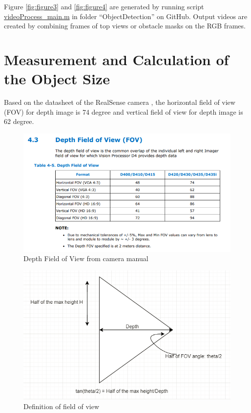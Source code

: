 \documentclass[
  oneside]{ubcthesis}
\begin{document}
Figure \ref{fig:figure3} and \ref{fig:figure4} are generated by running script \href{https://github.com/luckymeng7/EECE597/blob/master/ObjectDetection/videoProcess_main.m}{videoProcess\_main.m} in folder ``ObjectDetection'' on GitHub. Output videos are created by combining frames of top views or obstacle masks on the RGB frames.

\hypertarget{measurement-and-calculation-of-the-object-size}{%
\section{Measurement and Calculation of the Object Size}\label{measurement-and-calculation-of-the-object-size}}

Based on the datasheet of the RealSense camera \citep{realSenseD400}, the horizontal field of view (FOV) for depth image is 74 degree and vertical field of view for depth image is 62 degree.

\begin{figure}

{\centering \includegraphics[width=0.8\linewidth]{figures/12} 

}

\caption{Depth Field of View from camera manual \citep{realSenseD400}}\label{fig:figure12}
\end{figure}



\begin{figure}

{\centering \includegraphics[width=0.9\linewidth]{figures/5} 

}

\caption{Definition of field of view}\label{fig:figure5}
\end{figure}
\end{document}
